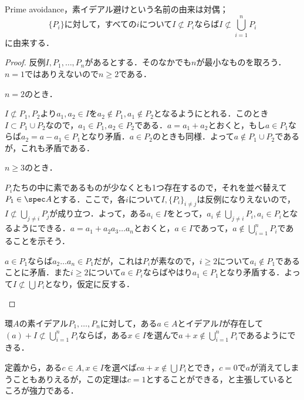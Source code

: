 Prime avoidance，素イデアル避けという名前の由来は対偶；
\[\{P_i\}\text{に対して，すべての}i\text{について}I\not\subset P_i\text{ならば}I\not\subset\bigcup_{i=1}^n P_i\]
に由来する．
\begin{proof}
	反例$I,P_1,\dots, P_n$があるとする．そのなかでも$n$が最小なものを取ろう．$n=1$ではありえないので$n\geq 2$である．
	
	\begin{sakura}
		\item $n=2$のとき．
		
		$I\not\subset P_1,P_2$より$a_1,a_2\in I$を$a_2\not\in P_1,a_1\not\in P_2$となるようにとれる．このとき$I\subset P_1\cup P_2$なので，$a_1\in P_1,a_2\in P_2$である．$a=a_1+a_2$とおくと，もし$a\in P_1$ならば$a_2=a-a_1\in P_1$となり矛盾．$a\in P_2$のときも同様．よって$a\not\in P_1\cup P_2$であるが，これも矛盾である．
		
		\item $n\geq3$のとき．
		
		$P_i$たちの中に素であるものが少なくとも1つ存在するので，それを並べ替えて$P_1\in\spec A$とする．ここで，各$i$について$I,\{P_i\}_{i\neq j}$は反例になりえないので，$I\not\subset\bigcup_{j\neq i}P_j$が成り立つ．よって，ある$a_i\in I$をとって，$a_i\not\in\bigcup_{j\neq i}P_i,a_i\in P_i$となるようにできる．$a=a_1+a_2a_3\dots a_n$とおくと，$a\in I$であって，$a\not\in\bigcup_{i=1}^n P_i$であることを示そう．
		
		$a\in P_1$ならば$a_2\dots a_n\in P_1$だが，これは$P_i$が素なので，$i\geq2$について$a_i\not\in P_1$であることに矛盾．また$i\geq2$について$a\in P_i$ならばやはり$a_1\in P_1$となり矛盾する．よって$I\not\subset\bigcup P_i$となり，仮定に反する．
	\end{sakura}
\end{proof}

\begin{thm}[Davisの補題]\label{thm:Davisの補題}
	環$A$の素イデアル$P_1,\dots,P_n$に対して，ある$a\in A$とイデアル$I$が存在して$(a)+I\not\subset\bigcup_{i=1}^n P_i$ならば，ある$x\in I$を選んで$a+x\not\in\bigcup_{i=1}^n P_i$であるようにできる．
\end{thm}

定義から，ある$c\in A,x\in I$を選べば$ca+x\not\in\bigcup P_i$とでき，$c=0$で$a$が消えてしまうこともありえるが，この定理は$c=1$とすることができる，と主張しているところが強力である．

